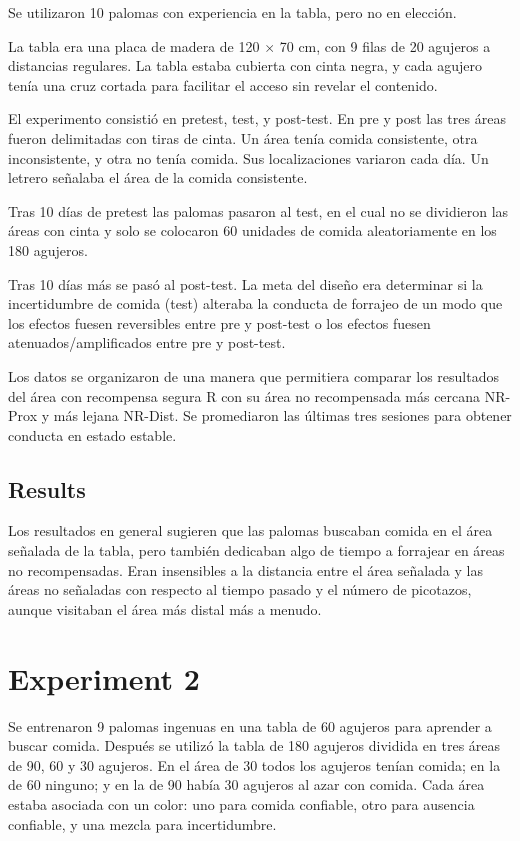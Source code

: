 \documentclass[a4paper,12pt]{article}
\begin{document}
Se utilizaron 10 palomas con experiencia en la tabla, pero no en elección.

La tabla era una placa de madera de 120 $\times$ 70 cm, con 9 filas de 20 agujeros a distancias regulares.
La tabla estaba cubierta con cinta negra, y cada agujero tenía una cruz cortada para facilitar el acceso sin revelar el contenido.

El experimento consistió en pretest, test, y post-test. En pre y post las tres áreas fueron delimitadas con tiras de cinta. Un área tenía comida consistente, otra inconsistente, y otra no tenía comida. Sus localizaciones variaron cada día. Un letrero señalaba el área de la comida consistente.

Tras 10 días de pretest las palomas pasaron al test, en el cual no se dividieron las áreas con cinta y solo se colocaron 60 unidades de comida aleatoriamente en los 180 agujeros.

Tras 10 días más se pasó al post-test. La meta del diseño era determinar si la incertidumbre de comida (test) alteraba la conducta de forrajeo de un modo que los efectos fuesen reversibles entre pre y post-test o los efectos fuesen atenuados/amplificados entre pre y post-test.

Los datos se organizaron de una manera que permitiera comparar los resultados del área con recompensa segura R con su área no recompensada más cercana NR-Prox y más lejana NR-Dist. Se promediaron las últimas tres sesiones para obtener conducta en estado estable.

\subsection{Results}

Los resultados en general sugieren que las palomas buscaban comida en el área señalada de la tabla, pero también dedicaban algo de tiempo a forrajear en áreas no recompensadas. Eran insensibles a la distancia entre el área señalada y las áreas no señaladas con respecto al tiempo pasado y el número de picotazos, aunque visitaban el área más distal más a menudo.

\section{Experiment 2}

Se entrenaron 9 palomas ingenuas en una tabla de 60 agujeros para aprender a buscar comida. Después se utilizó la tabla de 180 agujeros dividida en tres áreas de 90, 60 y 30 agujeros. En el área de 30 todos los agujeros tenían comida; en la de 60 ninguno; y en la de 90 había 30 agujeros al azar con comida. Cada área estaba asociada con un color: uno para comida confiable, otro para ausencia confiable, y una mezcla para incertidumbre.
\end{document}
